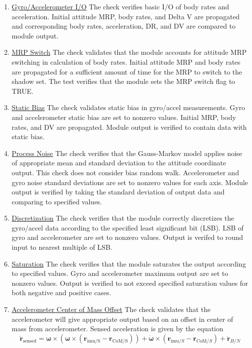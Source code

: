\documentclass[]{BasiliskReportMemo}
\begin{document}
\begin{enumerate}
	\item \underline{Gyro/Accelerometer I/O} The check verifies basic I/O of body rates and acceleration. Initial attitude MRP, body rates, and Delta V are propagated and corresponding body rates, acceleration, DR, and DV are compared to module output.
	\item \underline{MRP Switch} The check validates that the module accounts for attitude MRP switching in calculation of body rates. Initial attitude MRP and body rates are propagated for a sufficient amount of time for the MRP to switch to the shadow set. The test verifies that the module sets the MRP switch flag to TRUE.
	\item \underline{Static Bias} The check validates static bias in gyro/accel measurements. Gyro and accelerometer static bias are set to nonzero values. Initial MRP, body rates, and DV are propagated. Module output is verified to contain data with static bias.
	\item \underline{Process Noise} The check verifies that the Gauss-Markov model applies noise of appropriate mean and standard deviation to the attitude coordinate output. This check does not consider bias random walk. Accelerometer and gyro noise standard deviations are set to nonzero values for each axis. Module output is verified by taking the standard deviation of output data and comparing to specified values.
	\item \underline{Discretization} The check verifies that the module correctly discretizes the gyro/accel data according to the specified least significant bit (LSB). LSB of gyro and accelerometer are set to nonzero values. Output is verifed to round input to nearest multiple of LSB.
	\item \underline{Saturation} The check verifies that the module saturates the output according to specified values. Gyro and accelerometer maximum output are set to nonzero values. Output is verified to not exceed specified saturation values for both negative and positive cases.
	\item \underline{Accelerometer Center of Mass Offset} The check validates that the accelerometer will give appropriate output based on an offset in center of mass from accelerometer. Sensed acceleration is given by the equation
	\begin{equation}
	\ddot{\bm r}_\mathrm{sensed} = \bm\omega \times (\bm\omega \times (\bm r_{\mathrm{imu/S}} - \bm r_{\mathrm{CoM/S}})) + \dot{\bm\omega} \times (\bm r_{\mathrm{imu}/S} - \bm r_{\mathrm{CoM}/S}) + \ddot{\bm r}_{B/N}

\end{equation}
\end{enumerate}
\end{document}
